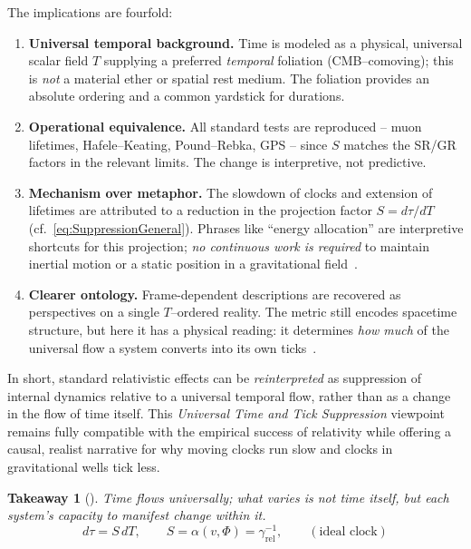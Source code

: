 \documentclass[12pt]{article}
\theoremstyle{plain} %
\newcommand{\gammarel}{\gamma_{\!\mathrm{rel}}}
\newtheorem{innerTakeaway}{Takeaway}
\newenvironment{takeaway}[1][]{
  \begin{mdframed}[linewidth=0.6pt,roundcorner=4pt]
  \begin{innerTakeaway}[#1]\label{takeaway:universal-flow}
}{\end{innerTakeaway}\end{mdframed}}
\begin{document}
\medskip
\noindent
The implications are fourfold:
\begin{enumerate}
  \item \textbf{Universal temporal background.} Time is modeled as a physical, universal scalar field $T$ supplying a preferred \emph{temporal} foliation (CMB–comoving); this is \emph{not} a material ether or spatial rest medium. The foliation provides an absolute ordering and a common yardstick for durations.
  \item \textbf{Operational equivalence.} All standard tests are reproduced – muon lifetimes, Hafele–Keating, Pound–Rebka, GPS – since $S$ matches the SR/GR factors in the relevant limits. The change is interpretive, not predictive.~\cite{Will2014,HafeleKeating1972a,HafeleKeating1972b,PoundRebka1960,Bailey1977,Ashby2003}
  \item \textbf{Mechanism over metaphor.} The slowdown of clocks and extension of lifetimes are attributed to a reduction in the projection factor $S=d\tau/dT$ (cf.~\eqref{eq:SuppressionGeneral}). Phrases like “energy allocation” are interpretive shortcuts for this projection; \emph{no continuous work is required} to maintain inertial motion or a static position in a gravitational field~\cite{HafeleKeating1972a,HafeleKeating1972b}.
  \item \textbf{Clearer ontology.} Frame-dependent descriptions are recovered as perspectives on a single $T$–ordered reality. The metric still encodes spacetime structure, but here it has a physical reading: it determines \emph{how much} of the universal flow a system converts into its own ticks~\cite{Carroll2004}.
\end{enumerate}

\noindent
In short, standard relativistic effects can be \emph{reinterpreted} as suppression of internal dynamics relative to a universal temporal flow, rather than as a change in the flow of time itself. This \emph{Universal Time and Tick Suppression} viewpoint remains fully compatible with the empirical success of relativity while offering a causal, realist narrative for why moving clocks run slow and clocks in gravitational wells tick less.

\begin{takeaway}\label{takeaway:universal-flow}
\emph{Time flows universally; what varies is not time itself, but each system’s capacity to manifest change within it.}
\begin{equation}
\label{eq:UniversalFlowBox}
\boxed{\, d\tau = S\,dT,\qquad S=\alpha(v,\Phi)=\gammarel^{-1},\qquad (\text{ideal clock})\,}
\end{equation}
\end{takeaway}
\end{document}
